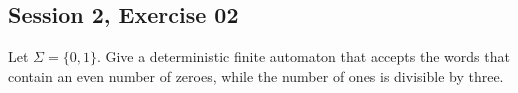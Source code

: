 \subsection{Session 2, Exercise 02}


Let $\Sigma=\{0,1\}$. Give a deterministic finite automaton that accepts the words that contain an even number of zeroes, while the number of ones is divisible by three.

